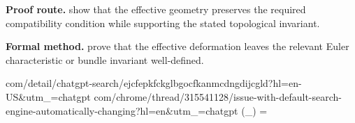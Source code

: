 \textbf{Proof route.} show that the effective geometry preserves the required compatibility condition while supporting the stated topological invariant.

\textbf{Formal method.} prove that the effective deformation leaves the relevant Euler characteristic or bundle invariant well-defined.

\medskip
{}

\begin{tzpsnapshot}
\end{tzpsnapshot}

\tzpequationlinks
  {com/detail/chatgpt-search/ejcfepkfckglbgocfkanmcdngdijcgld?hl=en-US&utm_{}=chatgpt}
  {com/chrome/thread/315541128/issue-with-default-search-engine-automatically-changing?hl=en&utm_{}=chatgpt}
  {\chi(_{}) = \cdots}
